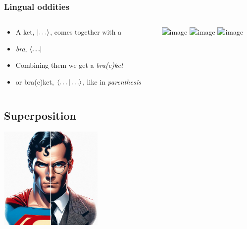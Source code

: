 \documentclass[10pt]{beamer}
\begin{document}
  \begin{frame}
    \frametitle{Lingual oddities}
    \begin{columns}
      \begin{column}{0.5\linewidth}
        \begin{itemize}
        \item<1-> A ket, $\ket{\dots}$, comes together with a 
        \item<2-> \emph{bra}, $\bra{\dots}$
        \item<3-> Combining them we get a \emph{bra(c)ket}
        \item<4-> or bra(c)ket, $\braket{\dots | \dots}$, like in \emph{parenthesis}
        \end{itemize}
      \end{column}
      \begin{column}{0.4\linewidth}
        \centering
        \includegraphics<2>[width=4cm]{img/bra.jpg}
        \includegraphics<3>[width=4cm]{img/braces.jpg}
        \includegraphics<4->[width=1cm]{img/brackets.png}
      \end{column}
    \end{columns}
  \end{frame}

\begin{frame}
\section{Superposition}
\centering
\includegraphics[width=5cm]{img/superman_clark_kent.jpeg}
\end{frame}
\end{document}
